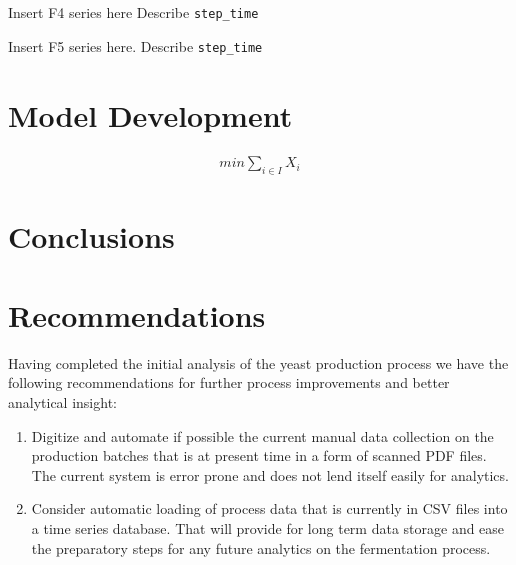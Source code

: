 \documentclass{article}
\begin{document}
Insert F4 series here
Describe \texttt{step\_time}

Insert F5 series here.
Describe \texttt{step\_time}

\section{Model Development}
\begin{align}
    min \sum_{i \in I}{X_i}    
\end{align}

\section{Conclusions}

\section{Recommendations}
Having completed the initial analysis of the yeast production process we have the following recommendations for further process improvements and better analytical insight:

\begin{enumerate}
\item Digitize and automate if possible the current manual data collection on the production batches that is at present time in a form of scanned PDF files. The current system is error prone and does not lend itself easily for analytics.
\item Consider automatic loading of process data that is currently in CSV files into a time series database. That will provide for long term data storage and ease the preparatory steps for any future analytics on the fermentation process.
\end{enumerate}

\listoffigures
\end{document}
